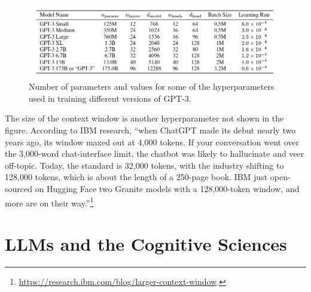 \begin{figure}[h]
\centering
\includegraphics[scale=.4]{./images/gpt3_params.png}
\caption[\url{https://arxiv.org/abs/2005.14165}.]{Number of parameters and values for some of the hyperparameters used in training different versions of GPT-3. }
\label{gptParams}
\end{figure}

The size of the context window is another hyperparameter not shown in the figure. According to IBM research, ``when ChatGPT made its debut nearly two years ago, its window maxed out at 4,000 tokens. If your conversation went over the 3,000-word chat-interface limit, the chatbot was likely to hallucinate and veer off-topic. Today, the standard is 32,000 tokens, with the industry shifting to 128,000 tokens, which is about the length of a 250-page book. IBM just open-sourced on Hugging Face two Granite models with a 128,000-token window, and more are on their way.''\footnote{\url{https://research.ibm.com/blog/larger-context-window}.}

\section{LLMs and the Cognitive Sciences}\label{llm_cogsci}

